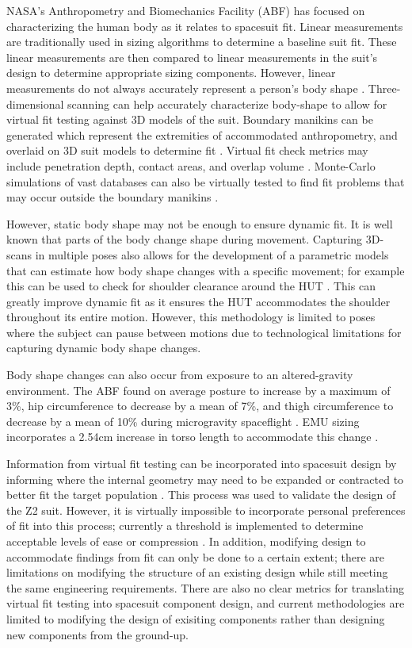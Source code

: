 \documentclass[defaultstyle,11pt]{thesis}
\begin{document}
NASA's Anthropometry and Biomechanics Facility (ABF) has focused on characterizing the human body as it relates to spacesuit fit.
Linear measurements are traditionally used in sizing algorithms to determine a baseline suit fit.
These linear measurements are then compared to linear measurements in the suit's design to determine appropriate sizing components.
However, linear measurements do not always accurately represent a person's body shape \citep{Margerum2010}.
Three-dimensional scanning can help accurately characterize body-shape to allow for virtual fit testing against 3D models of the suit.
Boundary manikins can be generated which represent the extremities of accommodated anthropometry, and overlaid on 3D suit models to determine fit \citep{Margerum2010}.
Virtual fit check metrics may include penetration depth, contact areas, and overlap volume \citep{Kim2019}.
Monte-Carlo simulations of vast databases can also be virtually tested to find fit problems that may occur outside the boundary manikins \citep{Kim2019}.

However, static body shape may not be enough to ensure dynamic fit.
It is well known that parts of the body change shape during movement.
Capturing 3D-scans in multiple poses also allows for the development of a parametric models that can estimate how body shape changes with a specific movement; for example this can be used to check for shoulder clearance around the HUT \citep{Kim2016}.
This can greatly improve dynamic fit as it ensures the HUT accommodates the shoulder throughout its entire motion.
However, this methodology is limited to poses where the subject can pause between motions due to technological limitations for capturing dynamic body shape changes.

Body shape changes can also occur from exposure to an altered-gravity environment.
The ABF found on average posture to increase by a maximum of 3\%, hip circumference to decrease by a mean of 7\%, and thigh circumference to decrease by a mean of 10\% during microgravity spaceflight \citep{Kim2019}.
EMU sizing incorporates a 2.54cm increase in torso length to accommodate this change \citep{Thornton1987}.

Information from virtual fit testing can be incorporated into spacesuit design by informing where the internal geometry may need to be expanded or contracted to better fit the target population \citep{Kim2019}.
This process was used to validate the design of the Z2 suit.
However, it is virtually impossible to incorporate personal preferences of fit into this process; currently a threshold is implemented to determine acceptable levels of ease or compression \citep{Kim2019}.
In addition, modifying design to accommodate findings from fit can only be done to a certain extent; there are limitations on modifying the structure of an existing design while still meeting the same engineering requirements.
There are also no clear metrics for translating virtual fit testing into spacesuit component design, and current methodologies are limited to modifying the design of exisiting components rather than designing new components from the ground-up.
\end{document}

